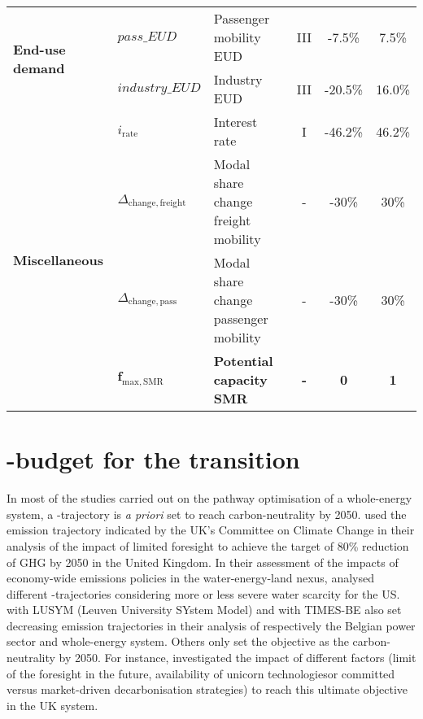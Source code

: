 \begin{table}[htbp!]
{\begin{tabular}{l l l c c c}
\multirow{2}{*}{\textbf{End-use demand}} & $pass\_EUD$ & Passenger mobility EUD & III & -7.5\% & 7.5\% \\
& $industry\_EUD$ & Industry EUD & III & -20.5\% & 16.0\% \\
\midrule

\multirow{4}{*}{\textbf{Miscellaneous}} &$i_{\mathrm{rate}}$  & Interest rate & I & -46.2\% & 46.2\% \\
& $\Delta_{\mathrm{change,freight}}$ & Modal share change freight mobility & - & -30\% & 30\% \\
& $\Delta_{\mathrm{change,pass}}$ & Modal share change passenger mobility & - & -30\% & 30\% \\
& $\bm{f_{\mathrm{max,SMR}}}$ & \textbf{Potential capacity \gls{SMR}} & \textbf{-} & \textbf{0} & \textbf{1} \\

\bottomrule							

\end{tabular}}
\end{table}

\section{-budget for the transition}
\label{sec:cs:CO2-budget}
In most of the studies carried out on the pathway optimisation of a whole-energy system, a -trajectory is \textit{a priori} set to reach carbon-neutrality by 2050. \citet{nerini2017myopic} used the emission trajectory indicated by the UK's Committee on Climate Change in their analysis of the impact of limited foresight to achieve the target of 80\% reduction of \gls{GHG} by 2050 in the United Kingdom. In their assessment of the impacts of economy-wide emissions policies in the water-energy-land nexus, \citet{licandeo2023assessing} analysed different -trajectories considering more or less severe water scarcity for the US. \citet{poncelet2016myopic} with LUSYM (Leuven University SYstem Model) and \citet{PATHS2050} with TIMES-BE also set decreasing emission trajectories in their analysis of respectively the Belgian power sector and whole-energy system.  Others only set the objective as the carbon-neutrality by 2050. For instance, \citet{heuberger2018impact} investigated the impact of different factors (\eg limit of the foresight in the future, availability of \og unicorn technologies\fg or committed versus market-driven decarbonisation strategies) to reach this ultimate objective in the UK system.\\

